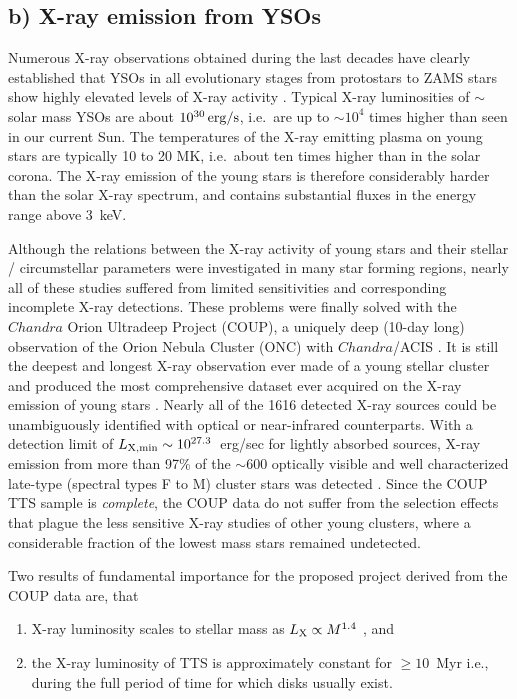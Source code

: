 \documentclass[10pt,fleqn,twoside]{article}
\begin{document}
\subsection*{b) X-ray emission from YSOs}

Numerous X-ray observations obtained during the last decades have clearly
established that YSOs in all evolutionary stages from
protostars  to  ZAMS stars show highly elevated levels of X-ray  activity
\citep{FM99,PZH96,PZ02,Preibisch_coup_orig,Preibisch11,Preibisch14}.
Typical X-ray luminosities of $\sim$ solar mass YSOs are about $10^{30}\,\rm erg/s$,
i.e.~are up to $\sim 10^4$ times higher than seen in our current Sun.
The temperatures of the X-ray emitting  plasma on young stars
are typically 10 to 20 MK,  i.e.~about ten times higher than in the solar corona.
The X-ray emission of the young stars is therefore considerably harder than the solar
X-ray spectrum, and contains substantial fluxes in the
energy range above 3~keV.

Although the relations between the X-ray activity of young stars and their
stellar / circumstellar parameters were investigated in many star forming regions,
nearly all of these studies suffered from
limited sensitivities and corresponding incomplete X-ray detections.
These problems were finally solved with the
$Chandra$ Orion Ultradeep Project (COUP), a uniquely deep (10-day long)
observation of the Orion Nebula Cluster (ONC)
with $Chandra$/ACIS \citep[for details of the observation and
data analysis see][]{Getman05}.
It is still the deepest and longest X-ray
observation ever made of a young stellar cluster and
produced the most comprehensive dataset ever acquired on the X-ray
emission of young stars \citep{Preibisch_coup_orig}.
Nearly all of the 1616 detected X-ray sources could be
unambiguously identified with optical or near-infrared counterparts.
With a detection limit of
$L_{\rm X,min} \sim 10^{27.3}$~erg/sec for lightly absorbed
sources, X-ray emission from more than 97\% of the
$\sim 600$
optically visible and well characterized late-type
(spectral types F to M) cluster stars
was detected \citep{Preibisch_coup_orig}. 
Since the COUP TTS sample is {\em complete}, 
 the COUP data do not suffer from the
selection effects that plague the less sensitive X-ray studies of
other young clusters,
where a considerable fraction of the lowest mass stars remained undetected.

Two results of fundamental importance for the proposed project 
derived from the COUP data are, that
\begin{enumerate}

\item X-ray luminosity scales to stellar mass as $L_{\rm X} \propto M^{1.4}$ \citep{Preibisch_coup_orig},
and  

\item the X-ray luminosity of TTS is approximately constant for $\ge 10$~Myr \citep{PF05}
 i.e., during the full period of time for which disks usually exist.
\end{enumerate}
\end{document}
